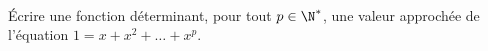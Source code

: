 \exer{[SATIO-003]}
\setcounter{numques}{0}~\\

\question{} Écrire une fonction déterminant, pour tout $p \in \N^\ast$, une valeur approchée de l'équation $1 = x + x^2 + \dots + x^p$. 